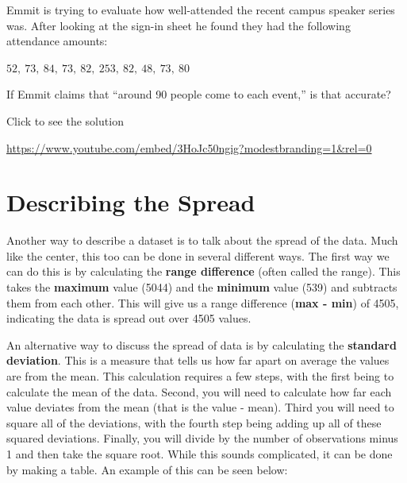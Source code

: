 \documentclass[
  letterpaper,
  DIV=11,
  numbers=noendperiod]{scrreprt}
\begin{document}
\begin{tcolorbox}[enhanced jigsaw, colframe=quarto-callout-tip-color-frame, colback=white, breakable, rightrule=.15mm, title=\textcolor{quarto-callout-tip-color}{\faLightbulb}\hspace{0.5em}{Try it Out}, bottomtitle=1mm, toptitle=1mm, titlerule=0mm, left=2mm, coltitle=black, colbacktitle=quarto-callout-tip-color!10!white, leftrule=.75mm, opacitybacktitle=0.6, bottomrule=.15mm, opacityback=0, arc=.35mm, toprule=.15mm]

Emmit is trying to evaluate how well-attended the recent campus speaker
series was. After looking at the sign-in sheet he found they had the
following attendance amounts:

\(52,\ 73,\ 84,\ 73,\ 82,\ 253,\ 82,\ 48,\ 73,\ 80\)

If Emmit claims that ``around 90 people come to each event,'' is that
accurate?

Click to see the solution

\url{https://www.youtube.com/embed/3HoJc50ngig?modestbranding=1&rel=0}

\end{tcolorbox}

\section{Describing the Spread}\label{describing-the-spread}

Another way to describe a dataset is to talk about the spread of the
data. Much like the center, this too can be done in several different
ways. The first way we can do this is by calculating the \textbf{range
difference} (often called the range). This takes the \textbf{maximum}
value (5044) and the \textbf{minimum} value (539) and subtracts them
from each other. This will give us a range difference (\textbf{max -
min}) of 4505, indicating the data is spread out over 4505 values.

An alternative way to discuss the spread of data is by calculating the
\textbf{standard deviation}. This is a measure that tells us how far
apart on average the values are from the mean. This calculation requires
a few steps, with the first being to calculate the mean of the data.
Second, you will need to calculate how far each value deviates from the
mean (that is the value - mean). Third you will need to square all of
the deviations, with the fourth step being adding up all of these
squared deviations. Finally, you will divide by the number of
observations minus 1 and then take the square root. While this sounds
complicated, it can be done by making a table. An example of this can be
seen below:
\end{document}

